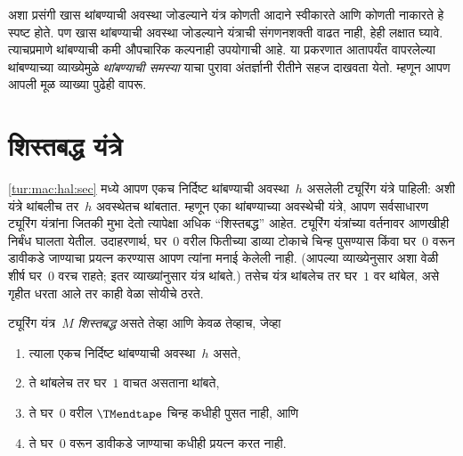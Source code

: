 \begin{explain}
अशा प्रसंगी खास थांबण्याची अवस्था जोडल्याने यंत्र कोणती आदाने
स्वीकारते आणि कोणती नाकारते हे स्पष्ट होते. पण खास थांबण्याची
अवस्था जोडल्याने यंत्राची संगणनशक्ती वाढत नाही, हेही लक्षात
घ्यावे. त्याचप्रमाणे थांबण्याची कमी औपचारिक कल्पनाही उपयोगाची
आहे. या प्रकरणात आतापर्यंत वापरलेल्या थांबण्याच्या व्याख्येमुळे
\emph{थांबण्याची समस्या} याचा पुरावा अंतर्ज्ञानी रीतीने
सहज दाखवता येतो. म्हणून आपण आपली मूळ व्याख्या पुढेही वापरू.
\end{explain}











\section{शिस्तबद्ध यंत्रे}\label{tur:mac:dis:sec}

\begin{explain}
\ref{tur:mac:hal:sec} मध्ये आपण एकच निर्दिष्ट थांबण्याची अवस्था~$h$
असलेली ट्यूरिंग यंत्रे पाहिली: अशी यंत्रे थांबलीच तर~$h$
अवस्थेतच थांबतात. म्हणून एका थांबण्याच्या अवस्थेची यंत्रे, आपण
सर्वसाधारण ट्यूरिंग यंत्रांना जितकी मुभा देतो त्यापेक्षा अधिक
``शिस्तबद्ध'' आहेत. ट्यूरिंग यंत्रांच्या वर्तनावर आणखीही निर्बंध
घालता येतील. उदाहरणार्थ, घर~$0$ वरील फितीच्या डाव्या टोकाचे
चिन्ह पुसण्यास किंवा घर~$0$ वरून डावीकडे जाण्याचा प्रयत्न
करण्यास आपण त्यांना मनाई केलेली नाही. (आपल्या व्याख्येनुसार
अशा वेळी शीर्ष घर~$0$ वरच राहते; इतर व्याख्यांनुसार यंत्र
थांबते.) तसेच यंत्र थांबलेच तर घर~$1$ वर थांबेल, असे गृहीत
धरता आले तर काही वेळा सोयीचे ठरते.
\end{explain}

\begin{defn}\label{tur:mac:dis:defn:disciplined}
ट्यूरिंग यंत्र~$M$ \emph{शिस्तबद्ध} असते तेव्हा आणि केवळ तेव्हाच,
जेव्हा
\begin{enumerate}
    \item त्याला एकच निर्दिष्ट थांबण्याची अवस्था~$h$ असते,
    \item ते थांबलेच तर घर~$1$ वाचत असताना थांबते,
    \item ते घर~$0$ वरील $\TMendtape$ चिन्ह कधीही पुसत नाही, आणि
    \item ते घर~$0$ वरून डावीकडे जाण्याचा कधीही प्रयत्न करत नाही.
\end{enumerate}
\end{defn}

